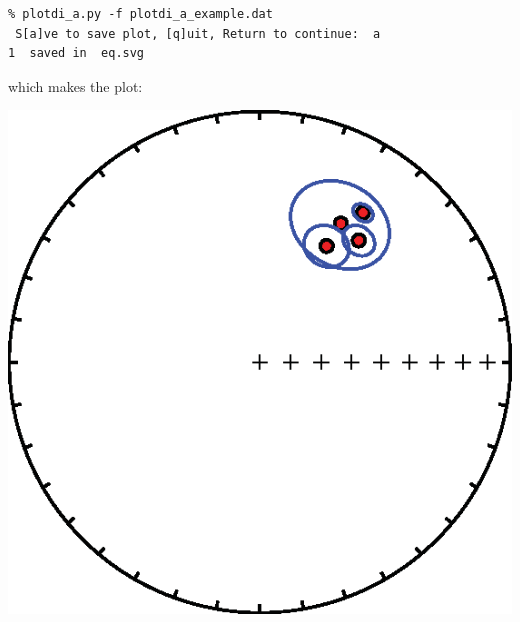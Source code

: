 \documentclass[11pt]{book}
\begin{document}
{{\begin{verbatim}
% plotdi_a.py -f plotdi_a_example.dat
 S[a]ve to save plot, [q]uit, Return to continue:  a
1  saved in  eq.svg
\end{verbatim}
\noindent  which makes the plot:

{\hskip 3.5cm %
  \includegraphics[width=7 cm]{EPSfiles/plotdi-a-example.eps}}
   





%



}}
\end{document}
